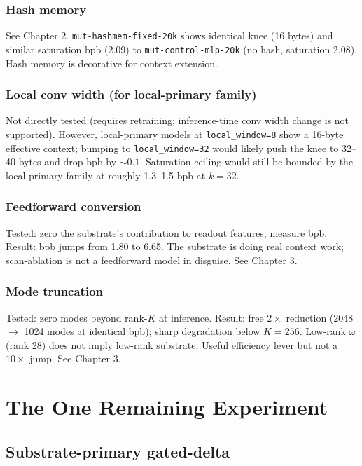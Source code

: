 \documentclass[11pt,openany]{book}
\begin{document}
\section{Hash memory}

See Chapter 2. \texttt{mut-hashmem-fixed-20k} shows identical knee (16 bytes)
and similar saturation bpb (2.09) to \texttt{mut-control-mlp-20k} (no hash,
saturation 2.08). Hash memory is decorative for context extension.

\section{Local conv width (for local-primary family)}

Not directly tested (requires retraining; inference-time conv width change
is not supported). However, local-primary models at
\texttt{local\_window=8} show a 16-byte effective context; bumping to
\texttt{local\_window=32} would likely push the knee to 32--40 bytes and
drop bpb by $\sim 0.1$. Saturation ceiling would still be bounded by the
local-primary family at roughly 1.3--1.5 bpb at $k=32$.

\section{Feedforward conversion}

Tested: zero the substrate's contribution to readout features, measure
bpb. Result: bpb jumps from 1.80 to 6.65. The substrate is doing real
context work; scan-ablation is not a feedforward model in disguise. See
Chapter 3.

\section{Mode truncation}

Tested: zero modes beyond rank-$K$ at inference. Result: free $2\times$
reduction (2048 $\to$ 1024 modes at identical bpb); sharp degradation
below $K=256$. Low-rank $\omega$ (rank 28) does not imply low-rank
substrate. Useful efficiency lever but not a $10\times$ jump. See Chapter 3.

\part{The One Remaining Experiment}

\chapter{Substrate-primary gated-delta}
\end{document}
